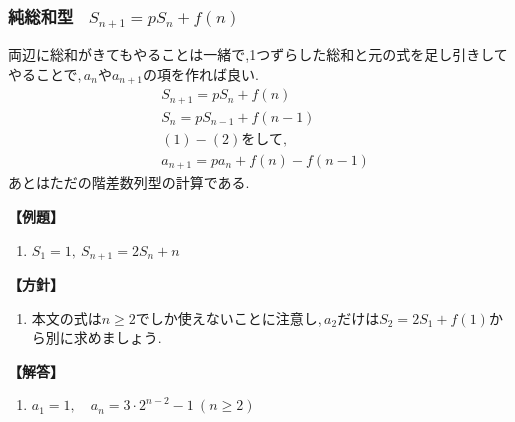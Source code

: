 \subsubsection{純総和型 \, $S_{n+1}=pS_n+f(n) $}
両辺に総和がきてもやることは一緒で,1つずらした総和と元の式を足し引きしてやることで,\,$a_n$や$a_{n+1}$の項を作れば良い.
\begin{align*}
   & S_{n+1}=pS_n+f(n) \tag{1}     \\
   & S_{n}=pS_{n-1}+f(n-1) \tag{2} \\
   & \text{$(1)-(2)$をして,}          \\
   & a_{n+1}=pa_{n}+f(n)-f(n-1)
\end{align*}
あとはただの階差数列型の計算である.

\noindent \textbf{【例題】}
\begin{enumerate}[label=(\arabic*),parsep=3pt]
  \item $\displaystyle S_1=1,\ S_{n+1}=2S_n+n$
\end{enumerate}

\noindent\textbf{【方針】}
\begin{enumerate}[label=(\arabic*),parsep=3pt]
  \item 本文の式は$n\ge2$でしか使えないことに注意し,\,$a_2$だけは$S_2=2S_1+f(1)$から別に求めましょう.
\end{enumerate}

\noindent\textbf{【解答】}
\begin{enumerate}[label=(\arabic*),parsep=3pt]
  \item $\displaystyle a_1=1,\quad a_n=3\cdot2^{n-2}-1\ (n\ge2)$
\end{enumerate}

